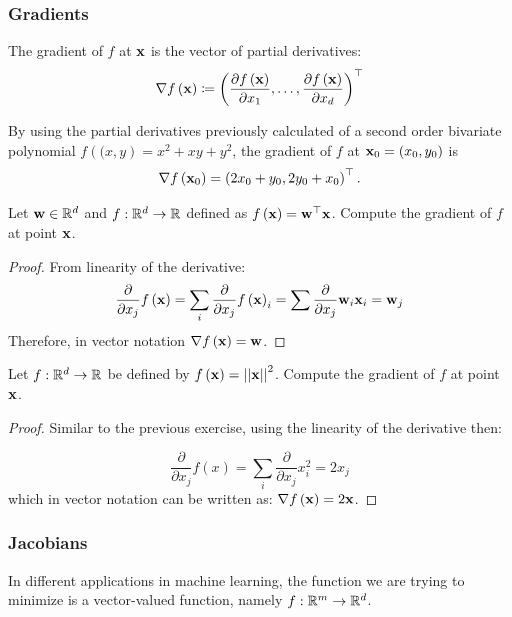 \subsubsection{Gradients}
\begin{definition}[Gradient]
The gradient of $f$ at $\mathbf{x}$ is the vector of partial derivatives:
$$\nabla f\left(\mathbf{x}\right) \coloneqq \left(\frac{\partial f\left(\mathbf{x}\right)}{\partial x_1},\ldots, \frac{\partial f\left(\mathbf{x}\right)}{\partial x_d} \right)^\top $$
\end{definition}


\begin{example}\label{exe:gradient_poly}
By using the partial derivatives previously calculated of a second order bivariate polynomial $f\left((x,y\right)=x^2 + xy + y^2$, the gradient of $f$ at $\mathbf{x}_0=\left(x_0,y_0\right)$ is  $$\nabla f\left(\mathbf{x}_0\right) = \left(2x_0+y_0, 2y_0+x_0\right)^\top.$$
\end{example}

\begin{exercise}\label{exe:linear_functional}
Let $\mathbf{w}\in\mathbb{R}^d$ and $f:\mathbb{R}^d\rightarrow\mathbb{R}$ defined as $f\left(\mathbf{x}\right)=\mathbf{w}^\top\mathbf{x}$. Compute the gradient of $f$ at point $\mathbf{x}$.
\end{exercise}
\begin{proof}
From linearity of the derivative:
$$ \frac{\partial}{\partial x_j}f\left(\mathbf{x}\right) = \sum_i \frac{\partial}{\partial x_j}f\left(\mathbf{x}\right)_i = \sum \frac{\partial}{\partial x_j} \mathbf{w}_i\mathbf{x}_i = \mathbf{w}_j  $$
Therefore, in vector notation $\nabla f\left(\mathbf{x}\right) = \mathbf{w}$.
\end{proof}

\begin{exercise}[Norm]\label{exe:grad_norm}
Let $f:\mathbb{R}^d\rightarrow\mathbb{R}$ be defined by $f\left(\mathbf{x}\right) = \left|\left| \mathbf{x}\right|\right|^2$. Compute the gradient of $f$ at point $\mathbf{x}$.
\end{exercise}
\begin{proof}
Similar to the previous exercise, using the linearity of the derivative then:

$$ \frac{\partial}{\partial x_j} f\left(x\right) = \sum_i \frac{\partial}{\partial x_j} x_i^2 = 2x_j $$
which in vector notation can be written as: $\nabla f\left(\mathbf{x}\right) = 2\mathbf{x}$.
\end{proof}


\subsubsection{Jacobians}
In different applications in machine learning, the function we are trying to minimize is a vector-valued function, namely $f:\mathbb{R}^m\rightarrow\mathbb{R}^d$. 

